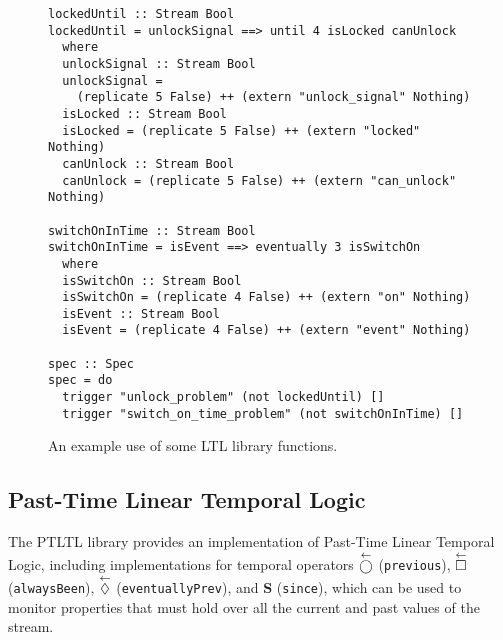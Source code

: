 \begin{figure*}[!htb]
\begin{lstlisting}[language = Copilot, frame = none]
lockedUntil :: Stream Bool
lockedUntil = unlockSignal ==> until 4 isLocked canUnlock
  where
  unlockSignal :: Stream Bool
  unlockSignal =
    (replicate 5 False) ++ (extern "unlock_signal" Nothing)
  isLocked :: Stream Bool
  isLocked = (replicate 5 False) ++ (extern "locked" Nothing)
  canUnlock :: Stream Bool
  canUnlock = (replicate 5 False) ++ (extern "can_unlock" Nothing)

switchOnInTime :: Stream Bool
switchOnInTime = isEvent ==> eventually 3 isSwitchOn
  where
  isSwitchOn :: Stream Bool
  isSwitchOn = (replicate 4 False) ++ (extern "on" Nothing)
  isEvent :: Stream Bool
  isEvent = (replicate 4 False) ++ (extern "event" Nothing)

spec :: Spec
spec = do
  trigger "unlock_problem" (not lockedUntil) []
  trigger "switch_on_time_problem" (not switchOnInTime) []
\end{lstlisting}
\caption{An example use of some LTL library functions.}
\label{fig:ltl_example}
\end{figure*}

\subsection{Past-Time Linear Temporal Logic}
The PTLTL library provides an implementation of Past-Time Linear Temporal Logic,
including implementations for temporal operators
$\overset{\leftarrow}{\bigcirc}$ ({\tt previous}), $\overset{\leftarrow}{\square}$
({\tt alwaysBeen}), $\overset{\leftarrow}{\lozenge}$ ({\tt eventuallyPrev}),
and $\mathbf{S}$ ({\tt since}), which can be used to monitor
properties that must hold over all the current and past values of the stream.


